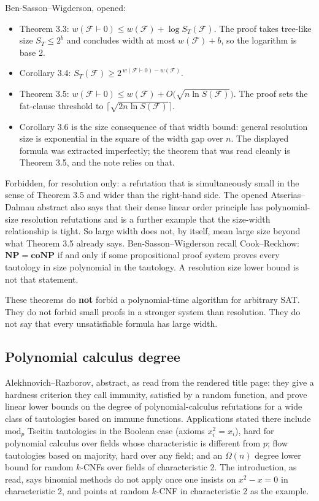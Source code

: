 \documentclass[11pt]{article}
\begin{document}
Ben-Sasson--Wigderson, opened:
\begin{itemize}
\item Theorem 3.3: \(w(\mathcal{F}\vdash 0)\le w(\mathcal{F})+\log S_T(\mathcal{F})\). The proof takes tree-like size \(S_T\le 2^b\) and concludes width at most \(w(\mathcal{F})+b\), so the logarithm is base 2.
\item Corollary 3.4: \(S_T(\mathcal{F})\ge 2^{\,w(\mathcal{F}\vdash 0)-w(\mathcal{F})}\).
\item Theorem 3.5: \(w(\mathcal{F}\vdash 0)\le w(\mathcal{F})+O\bigl(\sqrt{n\ln S(\mathcal{F})}\bigr)\). The proof sets the fat-clause threshold to \(\lceil\sqrt{2n\ln S(\mathcal{F})}\rceil\).
\item Corollary 3.6 is the size consequence of that width bound: general resolution size is exponential in the square of the width gap over \(n\). The displayed formula was extracted imperfectly; the theorem that was read cleanly is Theorem 3.5, and the note relies on that.
\end{itemize}
Forbidden, for resolution only: a refutation that is simultaneously small in the sense of Theorem 3.5 and wider than the right-hand side. The opened Atserias--Dalmau abstract also says that their dense linear order principle has polynomial-size resolution refutations and is a further example that the size-width relationship is tight. So large width does not, by itself, mean large size beyond what Theorem 3.5 already says. Ben-Sasson--Wigderson recall Cook--Reckhow: \(\mathbf{NP}=\mathbf{coNP}\) if and only if some propositional proof system proves every tautology in size polynomial in the tautology. A resolution size lower bound is not that statement.

These theorems do \textbf{not} forbid a polynomial-time algorithm for arbitrary SAT. They do not forbid small proofs in a stronger system than resolution. They do not say that every unsatisfiable formula has large width.

\subsection*{Polynomial calculus degree}
Alekhnovich--Razborov, abstract, as read from the rendered title page: they give a hardness criterion they call immunity, satisfied by a random function, and prove linear lower bounds on the degree of polynomial-calculus refutations for a wide class of tautologies based on immune functions. Applications stated there include \(\mathrm{mod}_p\) Tseitin tautologies in the Boolean case (axioms \(x_i^2=x_i\)), hard for polynomial calculus over fields whose characteristic is different from \(p\); flow tautologies based on majority, hard over any field; and an \(\Omega(n)\) degree lower bound for random \(k\)-CNFs over fields of characteristic 2. The introduction, as read, says binomial methods do not apply once one insists on \(x^2-x=0\) in characteristic 2, and points at random \(k\)-CNF in characteristic 2 as the example.
\end{document}
